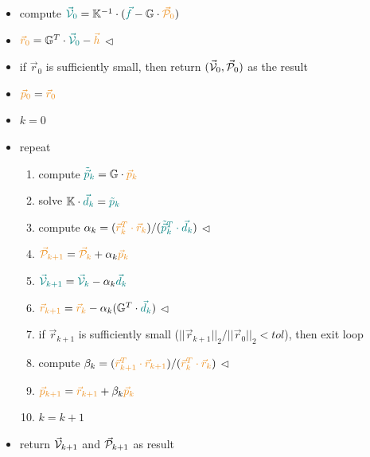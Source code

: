 \begin{itemize}
\item compute ${\color{teal} \vec{\cal V}_0}=\K^{-1}\cdot ({\color{teal} \vec{f}}-\G \cdot {\color{carrotorange} \vec{\cal P}_0})$
\item $ {\color{carrotorange} \vec{r}_0} = \G^T\cdot {\color{teal} \vec{\cal V}_0} - {\color{carrotorange}\vec{h}}$  \hspace{1cm} $\triangleleft$
\item if $\vec{r}_0$ is sufficiently small, then return $(\vec{\cal V}_0,\vec{\cal P}_0)$ as the result
\item ${\color{carrotorange} \vec{p}_0}={\color{carrotorange} \vec{r}_0}$
\item $k=0$
\item repeat
\begin{enumerate}
\item compute ${\color{teal} \tilde{\vec{p}}_k} = \G \cdot {\color{carrotorange} \vec{p}_k}$
\item solve ${\mathbb{K}}\cdot {\color{teal} \vec{d}_k} = {\color{teal} \tilde{p}_k }$
\item compute $\alpha_k=( {\color{carrotorange} \vec{r}_k^T \cdot  \vec{r}_k})
/({\color{teal} \tilde{\vec{p}}_k^T \cdot \vec{d}_k })$ \hspace{1cm} $\triangleleft$
\item ${\color{carrotorange} \vec{\cal P}_{k+1}} = {\color{carrotorange} \vec{\cal P}_k}+\alpha_k {\color{carrotorange} \vec{p}_k}$
\item ${\color{teal} \vec{\cal V}_{k+1}} = {\color{teal} \vec{\cal V}_k} - \alpha_k {\color{teal} \vec{d}_k}$
\item ${\color{carrotorange} \vec{r}_{k+1}} = {\color{carrotorange}\vec{r}_k} 
-\alpha_k (\G^T \cdot {\color{teal} \vec{d}_k}) $ \hspace{1cm} $\triangleleft$
\item if $\vec{r}_{k+1}$ is sufficiently small ($||\vec{r}_{k+1}||_2/||\vec{r}_0||_2 <tol$), then exit loop
\item compute $\beta_k=({\color{carrotorange} \vec{r}_{k+1}^T \cdot \vec{r}_{k+1}})
/({\color{carrotorange} \vec{r}_k^T \cdot \vec{r}_k})$ \hspace{1cm} $\triangleleft$
\item ${\color{carrotorange} \vec{p}_{k+1}} = {\color{carrotorange} \vec{r}_{k+1} }+ \beta_k {\color{carrotorange}\vec{p}_k}$
\item $k=k+1$
\end{enumerate}
\item return $\vec{\cal V}_{k+1}$ and $\vec{\cal P}_{k+1}$ as result
\end{itemize}

